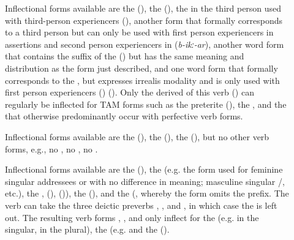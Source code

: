 \begin{description}
\item[ ]
		Inflectional forms available are the  (), the  (), the  in the third person used with third-person experiencers (), another  form that formally corresponds to a third person but can only be used with first person experiencers in assertions and second person experiencers in  (\textit{b-ikː-ar}), another word form that contains the suffix of the  () but has the same meaning and distribution as the form just described, and one word form that formally corresponds to the , but expresses irrealis modality and is only used with first person experiencers () (). Only the derived  of this verb () can regularly be inflected for TAM forms such as the preterite (), the , and the  that otherwise predominantly occur with perfective verb forms.

\item[ ]
		Inflectional forms available are the  (), the  (), the  (), but no other verb forms, e.g., no , no , no .
		
\item[ ]
		Inflectional forms available are the  (), the  (e.g. the form used for feminine singular addressees  or  with no difference in meaning; masculine singular \slash{}, etc.), the ,  (),  ()), the  (), and the  (, whereby the  form omits the  prefix. The verb can take the three deictic preverbs , , and , in which case the   is left out. The resulting verb forms , , and  only inflect for the  (e.g.  in the singular,  in the plural), the  (e.g.  and the  ().
\end{description}

